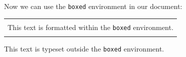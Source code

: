 \documentclass{article}
\newenvironment{boxed}
{\begin{center}
		\begin{tabular}{|p{0.9\textwidth}|}
			\hline\\
		}
		{ 
			\\\\\hline
		\end{tabular} 
	\end{center}
}
\begin{document}
	Now we can use the \texttt{boxed} environment in our document:
	
	\begin{boxed}
		This text is formatted within the \texttt{boxed} environment.
	\end{boxed}
	
	This text is typeset outside the \texttt{boxed} environment.
\end{document}
